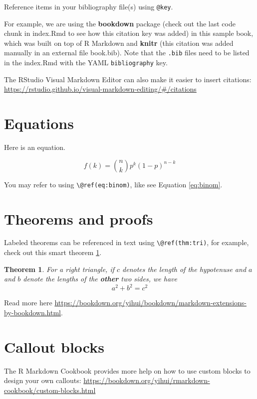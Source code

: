 \documentclass[
]{book}
\newtheorem{theorem}{Theorem}[chapter]
\theoremstyle{definition}
\theoremstyle{definition}
\theoremstyle{definition}
\theoremstyle{definition}
\theoremstyle{remark}
\begin{document}
Reference items in your bibliography file(s) using \texttt{@key}.

For example, we are using the \textbf{bookdown} package \citep{R-bookdown} (check out the last code chunk in index.Rmd to see how this citation key was added) in this sample book, which was built on top of R Markdown and \textbf{knitr} \citep{xie2015} (this citation was added manually in an external file book.bib).
Note that the \texttt{.bib} files need to be listed in the index.Rmd with the YAML \texttt{bibliography} key.

The RStudio Visual Markdown Editor can also make it easier to insert citations: \url{https://rstudio.github.io/visual-markdown-editing/\#/citations}

\hypertarget{equations}{%
\section{Equations}\label{equations}}

Here is an equation.

\begin{equation} 
  f\left(k\right) = \binom{n}{k} p^k\left(1-p\right)^{n-k}
  \label{eq:binom}
\end{equation}

You may refer to using \texttt{\textbackslash{}@ref(eq:binom)}, like see Equation \eqref{eq:binom}.

\hypertarget{theorems-and-proofs}{%
\section{Theorems and proofs}\label{theorems-and-proofs}}

Labeled theorems can be referenced in text using \texttt{\textbackslash{}@ref(thm:tri)}, for example, check out this smart theorem \ref{thm:tri}.

\begin{theorem}
\protect\hypertarget{thm:tri}{}\label{thm:tri}For a right triangle, if \(c\) denotes the \emph{length} of the hypotenuse
and \(a\) and \(b\) denote the lengths of the \textbf{other} two sides, we have
\[a^2 + b^2 = c^2\]
\end{theorem}

Read more here \url{https://bookdown.org/yihui/bookdown/markdown-extensions-by-bookdown.html}.

\hypertarget{callout-blocks}{%
\section{Callout blocks}\label{callout-blocks}}

The R Markdown Cookbook provides more help on how to use custom blocks to design your own callouts: \url{https://bookdown.org/yihui/rmarkdown-cookbook/custom-blocks.html}

  
\end{document}
